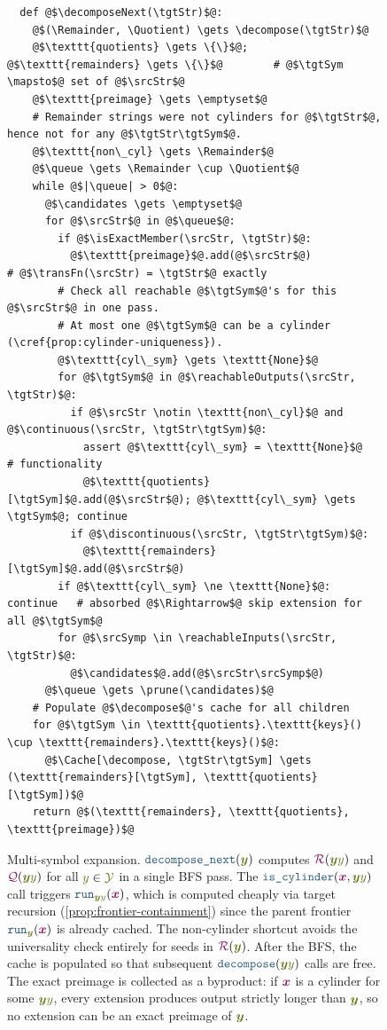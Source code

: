 \documentclass{article}
\theoremstyle{plain}
\newcommand{\mymacro}[1]{#1}
\newcommand{\Quotient}{{\color{TokenColor}\mathcal{Q}}}
\newcommand{\Remainder}{{\color{TokenColor}\mathcal{R}}}
\newcommand{\transFnSym}[0]{f}
\newcommand{\transFn}{\ensuremath{{\color{CharacterColor}\transFnSym}}\xspace}
\newcommand{\srcSymp}{{\color{TokenColor}x^\prime}}
\newcommand{\srcStr}{\ensuremath{{\color{TokenColor}\boldsymbol{x}}}\xspace}
\newcommand{\tgtSym}{{\color{CharacterColor}y}}
\newcommand{\tgtStr}{{\color{CharacterColor}\boldsymbol{y}}}
\newcommand{\tgtAlphabet}[0]{{\color{CharacterColor}\ensuremath{\mathcal{Y}}}\xspace}
\newcommand{\queue}[0]{\texttt{q}}
\newcommand{\candidates}[0]{\texttt{C}}
\newcommand{\myMintedFunc}[1]{\mbox{\texttt{{\color{StormBlue}#1}}}}
\newcommand{\continuous}[0]{\myMintedFunc{is\_cylinder}}
\newcommand{\discontinuous}[0]{\myMintedFunc{is\_member}}
\newcommand{\prune}[0]{\myMintedFunc{prune}}
\newcommand{\decompose}[0]{\myMintedFunc{decompose}}
\newcommand{\runFrontier}[0]{\myMintedFunc{run}}
\newcommand{\reachableOutputs}[0]{\myMintedFunc{reachable\_outputs}}
\newcommand{\reachableInputs}[0]{\myMintedFunc{reachable\_inputs}}
\newcommand{\isExactMember}[0]{\myMintedFunc{is\_exact\_member}}
\newcommand{\decomposeNext}[0]{\myMintedFunc{decompose\_next}}
\newcommand{\Cache}{\mymacro{\texttt{cache}}}
\begin{document}
\begin{figure}[H]
\centering
\begin{verbatim}
  def @$\decomposeNext(\tgtStr)$@:
    @$(\Remainder, \Quotient) \gets \decompose(\tgtStr)$@
    @$\texttt{quotients} \gets \{\}$@; @$\texttt{remainders} \gets \{\}$@        # @$\tgtSym \mapsto$@ set of @$\srcStr$@
    @$\texttt{preimage} \gets \emptyset$@
    # Remainder strings were not cylinders for @$\tgtStr$@, hence not for any @$\tgtStr\tgtSym$@.
    @$\texttt{non\_cyl} \gets \Remainder$@
    @$\queue \gets \Remainder \cup \Quotient$@
    while @$|\queue| > 0$@:
      @$\candidates \gets \emptyset$@
      for @$\srcStr$@ in @$\queue$@:
        if @$\isExactMember(\srcStr, \tgtStr)$@:
          @$\texttt{preimage}$@.add(@$\srcStr$@)               # @$\transFn(\srcStr) = \tgtStr$@ exactly
        # Check all reachable @$\tgtSym$@'s for this @$\srcStr$@ in one pass.
        # At most one @$\tgtSym$@ can be a cylinder (\cref{prop:cylinder-uniqueness}).
        @$\texttt{cyl\_sym} \gets \texttt{None}$@
        for @$\tgtSym$@ in @$\reachableOutputs(\srcStr, \tgtStr)$@:
          if @$\srcStr \notin \texttt{non\_cyl}$@ and @$\continuous(\srcStr, \tgtStr\tgtSym)$@:
            assert @$\texttt{cyl\_sym} = \texttt{None}$@      # functionality
            @$\texttt{quotients}[\tgtSym]$@.add(@$\srcStr$@); @$\texttt{cyl\_sym} \gets \tgtSym$@; continue
          if @$\discontinuous(\srcStr, \tgtStr\tgtSym)$@:
            @$\texttt{remainders}[\tgtSym]$@.add(@$\srcStr$@)
        if @$\texttt{cyl\_sym} \ne \texttt{None}$@: continue   # absorbed @$\Rightarrow$@ skip extension for all @$\tgtSym$@
        for @$\srcSymp \in \reachableInputs(\srcStr, \tgtStr)$@:
          @$\candidates$@.add(@$\srcStr\srcSymp$@)
      @$\queue \gets \prune(\candidates)$@
    # Populate @$\decompose$@'s cache for all children
    for @$\tgtSym \in \texttt{quotients}.\texttt{keys}() \cup \texttt{remainders}.\texttt{keys}()$@:
      @$\Cache[\decompose, \tgtStr\tgtSym] \gets (\texttt{remainders}[\tgtSym], \texttt{quotients}[\tgtSym])$@
    return @$(\texttt{remainders}, \texttt{quotients}, \texttt{preimage})$@
\end{verbatim}
\caption{Multi-symbol expansion.
$\decomposeNext(\tgtStr)$ computes $\Remainder(\tgtStr\tgtSym)$ and
$\Quotient(\tgtStr\tgtSym)$ for all $\tgtSym \in \tgtAlphabet$ in a single
BFS pass.
The $\continuous(\srcStr, \tgtStr\tgtSym)$ call triggers
$\runFrontier_{\tgtStr\tgtSym}(\srcStr)$, which is computed cheaply via
target recursion (\cref{prop:frontier-containment}) since the parent frontier
$\runFrontier_\tgtStr(\srcStr)$ is already cached.
The non-cylinder shortcut avoids the universality check entirely for
seeds in $\Remainder(\tgtStr)$.
After the BFS, the cache is populated so that subsequent
$\decompose(\tgtStr\tgtSym)$ calls are free.
The exact preimage is collected as a byproduct: if $\srcStr$ is a cylinder for
some $\tgtStr\tgtSym$, every extension produces output strictly longer than
$\tgtStr$, so no extension can be an exact preimage of $\tgtStr$.}
\label{fig:decompose-next}
\end{figure}
\end{document}
